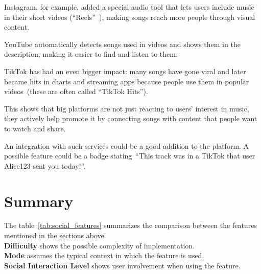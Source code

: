 Instagram, for example, added a special audio tool that lets users include music in their short
videos (``Reels''~\parencite{inst_audio}), making songs reach more people through visual content.

YouTube automatically detects songs used in videos and shows them in the description,
making it easier to find and listen to them.~\parencite{youtube_music_detection}

TikTok has had an even bigger impact: many songs have gone viral and later became hits
in charts and streaming apps because people use
them in popular videos~(these are often called ``TikTok Hits'').~\parencite{tiktok_billboard}

This shows that big platforms are not just reacting to users' interest in music, they
actively help promote it by connecting songs with content that people want to watch and share.

An integration with such services could be a good addition to the platform.
A possible feature could be a badge stating~``This track was in a TikTok that user Alice123 sent you today!''.


\section*{Summary}

The table~\ref{tab:social_features} summarizes the comparison between the features mentioned
in the sections above.\\
\textbf{Difficulty} shows the possible complexity of implementation.\\
\textbf{Mode} assumes the typical context in which the feature is used.\\
\textbf{Social Interaction Level} shows user involvement when using the feature.\\

